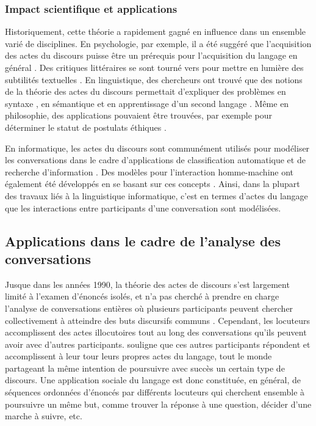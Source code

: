 \documentclass[10pt,a4paper,twoside]{article}
\begin{document}
\subsubsection{Impact scientifique et applications}

Historiquement, cette théorie a rapidement gagné en influence dans un ensemble varié de disciplines. En psychologie, par exemple, il a été suggéré que l'acquisition des actes du discours puisse être un prérequis pour l'acquisition du langage en général \cite{bruner1975communication, bates1977gesture}. Des critiques littéraires se sont tourné vers \citeauthor{austin1975how} pour mettre en lumière des subtilités textuelles \cite{ohmann1971speech}. En linguistique, des chercheurs ont trouvé que des notions de la théorie des actes du discours permettait d'expliquer des problèmes en syntaxe \cite{sadock1974toward}, en sémantique \cite{fillmore1971some} et en apprentissage d'un second langage \cite{jakobovits1974context}. Même en philosophie, des applications pouvaient être trouvées, par exemple pour déterminer le statut de postulats éthiques \cite{searle1969speech}.

En informatique, les actes du discours sont communément utilisés pour modéliser les conversations dans le cadre d'applications de classification automatique et de recherche d'information \cite{twitchell2004using}. Des modèles pour l'interaction homme-machine ont également été développés en se basant sur ces concepts \cite{morelli1991computational}. Ainsi, dans la plupart des travaux liés à la linguistique informatique, c’est en termes d’actes du langage que les interactions entre participants d’une conversation sont modélisées.

\subsection{Applications dans le cadre de l'analyse des conversations}
\label{subsec:applications_in_conversation_analysis}


Jusque dans les années 1990, la théorie des actes de discours s'est largement limité à l'examen d'énoncés isolés, et n'a pas cherché à prendre en charge l'analyse de conversations entières où plusieurs participants peuvent chercher collectivement à atteindre des buts discursifs communs \cite{vanderveken1994theorie}. Cependant, les locuteurs accomplissent des actes illocutoires tout au long des conversations qu'ils peuvent avoir avec d'autres participants. \citet{vanderveken1994theorie} souligne que ces autres participants répondent et accomplissent à leur tour leurs propres actes du langage, tout le monde partageant la même intention de poursuivre avec succès un certain type de discours. Une application sociale du langage est donc constituée, en général, de séquences ordonnées d'énoncés par différents locuteurs qui cherchent ensemble à poursuivre un même but, comme trouver la réponse à une question, décider d'une marche à suivre, etc.
\end{document}
